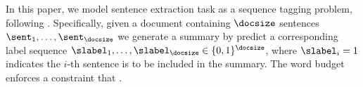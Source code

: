 In this paper, we model sentence extraction task as a sequence tagging problem, following \cite{} .
Specifically, given a document containing $\docsize$ sentences $\sent_1, \ldots, 
\sent_{\docsize}$ we generate a summary by predict a corresponding label sequence $\slabel_1,
\ldots, \slabel_{\docsize} \in \{0, 1\}^{\docsize}$, where $\slabel_i = 1$ 
indicates the $i$-th sentence is to be included in the summary.
The word budget enforces a constraint that .

